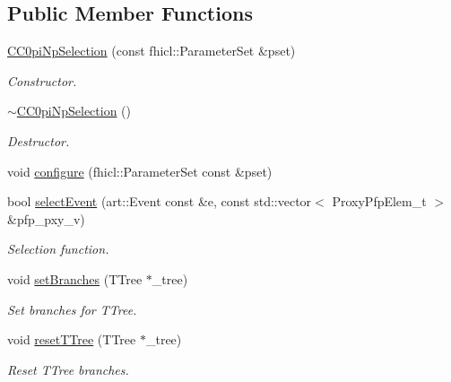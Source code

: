 \subsection*{Public Member Functions}
\begin{DoxyCompactItemize}
\item 
\hyperlink{classselection_1_1CC0piNpSelection_a5770519e6639db45cb9f3a4b1bf3efc2}{C\+C0pi\+Np\+Selection} (const fhicl\+::\+Parameter\+Set \&pset)
\begin{DoxyCompactList}\small\item\em Constructor. \end{DoxyCompactList}\item 
\hyperlink{classselection_1_1CC0piNpSelection_a7f809f358e84885ae2f08f54b4b8183b}{$\sim$\+C\+C0pi\+Np\+Selection} ()\hypertarget{classselection_1_1CC0piNpSelection_a7f809f358e84885ae2f08f54b4b8183b}{}\label{classselection_1_1CC0piNpSelection_a7f809f358e84885ae2f08f54b4b8183b}

\begin{DoxyCompactList}\small\item\em Destructor. \end{DoxyCompactList}\item 
void \hyperlink{classselection_1_1CC0piNpSelection_ace78372ffb6d92911f79ded647aacf4c}{configure} (fhicl\+::\+Parameter\+Set const \&pset)
\item 
bool \hyperlink{classselection_1_1CC0piNpSelection_aee88d296a2ebad59acadfd919139d96f}{select\+Event} (art\+::\+Event const \&e, const std\+::vector$<$ Proxy\+Pfp\+Elem\+\_\+t $>$ \&pfp\+\_\+pxy\+\_\+v)
\begin{DoxyCompactList}\small\item\em Selection function. \end{DoxyCompactList}\item 
void \hyperlink{classselection_1_1CC0piNpSelection_a6a14e4d0ff713ed2c75055019d278422}{set\+Branches} (T\+Tree $\ast$\+\_\+tree)
\begin{DoxyCompactList}\small\item\em Set branches for T\+Tree. \end{DoxyCompactList}\item 
void \hyperlink{classselection_1_1CC0piNpSelection_a3d7a6aa0fbd41f4a77390a160ee64e35}{reset\+T\+Tree} (T\+Tree $\ast$\+\_\+tree)
\begin{DoxyCompactList}\small\item\em Reset T\+Tree branches. \end{DoxyCompactList}\end{DoxyCompactItemize}
